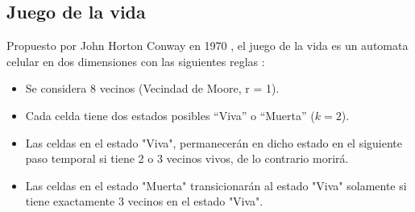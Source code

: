 \subsection{Juego de la vida}\label{subsec:juego-de-la-vida}
Propuesto por John Horton Conway en 1970 \cite{gardner1970life}, el juego de la vida es un automata celular en dos dimensiones con las siguientes reglas \cite{toffoli1987cellular}:
\begin{itemize}
    \item Se considera 8 vecinos (Vecindad de Moore, r = 1).
    \item Cada celda tiene dos estados posibles “Viva” o “Muerta” ($k=2$).
    \item Las celdas en el estado "Viva", permanecerán en dicho estado en el siguiente paso temporal si tiene 2 o 3 vecinos vivos, de lo contrario morirá.
    \item Las celdas en el estado "Muerta" transicionarán al estado "Viva" solamente si tiene exactamente 3 vecinos en el estado "Viva".
\end{itemize}
